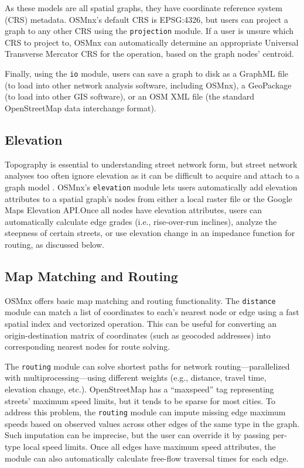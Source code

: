\documentclass[12pt,letterpaper]{article} %
\begin{document}
As these models are all spatial graphs, they have coordinate reference system (CRS) metadata. OSMnx's default CRS is EPSG:4326, but users can project a graph to any other CRS using the \texttt{projection} module. If a user is unsure which CRS to project to, OSMnx can automatically determine an appropriate Universal Transverse Mercator CRS for the operation, based on the graph nodes' centroid.

Finally, using the \texttt{io} module, users can save a graph to disk as a GraphML file (to load into other network analysis software, including OSMnx), a GeoPackage (to load into other GIS software), or an OSM XML file (the standard OpenStreetMap data interchange format).

\subsection{Elevation}

Topography is essential to understanding street network form, but street network analyses too often ignore elevation as it can be difficult to acquire and attach to a graph model \citep{boeing_street_2022}. OSMnx's \texttt{elevation} module lets users automatically add elevation attributes to a spatial graph's nodes from either a local raster file or the Google Maps Elevation API.\@ Once all nodes have elevation attributes, users can automatically calculate edge grades (i.e., rise-over-run inclines), analyze the steepness of certain streets, or use elevation change in an impedance function for routing, as discussed below.

\subsection{Map Matching and Routing}

OSMnx offers basic map matching and routing functionality. The \texttt{distance} module can match a list of coordinates to each's nearest node or edge using a fast spatial index and vectorized operation. This can be useful for converting an origin-destination matrix of coordinates (such as geocoded addresses) into corresponding nearest nodes for route solving.

The \texttt{routing} module can solve shortest paths for network routing---parallelized with multiprocessing---using different weights (e.g., distance, travel time, elevation change, etc.). OpenStreetMap has a \enquote{maxspeed} tag representing streets' maximum speed limits, but it tends to be sparse for most cities. To address this problem, the \texttt{routing} module can impute missing edge maximum speeds based on observed values across other edges of the same type in the graph. Such imputation can be imprecise, but the user can override it by passing per-type local speed limits. Once all edges have maximum speed attributes, the module can also automatically calculate free-flow traversal times for each edge.
\end{document}
